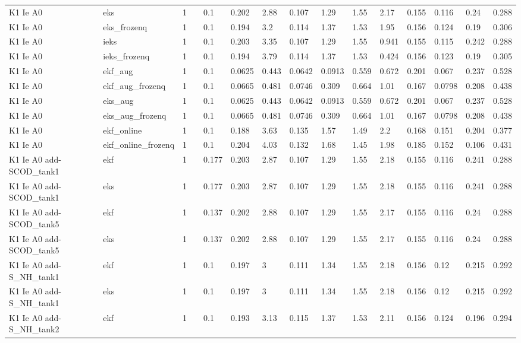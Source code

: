 \begin{table}[t]
\begin{tabular}{lllllllllllllll}
K1 Ie A0 & eks & 1 &  & 0.1 & 0.202 & 2.88 & 0.107 & 1.29 & 1.55 & 2.17 & 0.155 & 0.116 & 0.24 & 0.288 \\
K1 Ie A0 & eks\_frozenq & 1 &  & 0.1 & 0.194 & 3.2 & 0.114 & 1.37 & 1.53 & 1.95 & 0.156 & 0.124 & 0.19 & 0.306 \\
K1 Ie A0 & ieks & 1 &  & 0.1 & 0.203 & 3.35 & 0.107 & 1.29 & 1.55 & 0.941 & 0.155 & 0.115 & 0.242 & 0.288 \\
K1 Ie A0 & ieks\_frozenq & 1 &  & 0.1 & 0.194 & 3.79 & 0.114 & 1.37 & 1.53 & 0.424 & 0.156 & 0.123 & 0.19 & 0.305 \\
K1 Ie A0 & ekf\_aug & 1 &  & 0.1 & 0.0625 & 0.443 & 0.0642 & 0.0913 & 0.559 & 0.672 & 0.201 & 0.067 & 0.237 & 0.528 \\
K1 Ie A0 & ekf\_aug\_frozenq & 1 &  & 0.1 & 0.0665 & 0.481 & 0.0746 & 0.309 & 0.664 & 1.01 & 0.167 & 0.0798 & 0.208 & 0.438 \\
K1 Ie A0 & eks\_aug & 1 &  & 0.1 & 0.0625 & 0.443 & 0.0642 & 0.0913 & 0.559 & 0.672 & 0.201 & 0.067 & 0.237 & 0.528 \\
K1 Ie A0 & eks\_aug\_frozenq & 1 &  & 0.1 & 0.0665 & 0.481 & 0.0746 & 0.309 & 0.664 & 1.01 & 0.167 & 0.0798 & 0.208 & 0.438 \\
K1 Ie A0 & ekf\_online & 1 &  & 0.1 & 0.188 & 3.63 & 0.135 & 1.57 & 1.49 & 2.2 & 0.168 & 0.151 & 0.204 & 0.377 \\
K1 Ie A0 & ekf\_online\_frozenq & 1 &  & 0.1 & 0.204 & 4.03 & 0.132 & 1.68 & 1.45 & 1.98 & 0.185 & 0.152 & 0.106 & 0.431 \\
K1 Ie A0 add-SCOD\_tank1 & ekf & 1 &  & 0.177 & 0.203 & 2.87 & 0.107 & 1.29 & 1.55 & 2.18 & 0.155 & 0.116 & 0.241 & 0.288 \\
K1 Ie A0 add-SCOD\_tank1 & eks & 1 &  & 0.177 & 0.203 & 2.87 & 0.107 & 1.29 & 1.55 & 2.18 & 0.155 & 0.116 & 0.241 & 0.288 \\
K1 Ie A0 add-SCOD\_tank5 & ekf & 1 &  & 0.137 & 0.202 & 2.88 & 0.107 & 1.29 & 1.55 & 2.17 & 0.155 & 0.116 & 0.24 & 0.288 \\
K1 Ie A0 add-SCOD\_tank5 & eks & 1 &  & 0.137 & 0.202 & 2.88 & 0.107 & 1.29 & 1.55 & 2.17 & 0.155 & 0.116 & 0.24 & 0.288 \\
K1 Ie A0 add-S\_NH\_tank1 & ekf & 1 &  & 0.1 & 0.197 & 3 & 0.111 & 1.34 & 1.55 & 2.18 & 0.156 & 0.12 & 0.215 & 0.292 \\
K1 Ie A0 add-S\_NH\_tank1 & eks & 1 &  & 0.1 & 0.197 & 3 & 0.111 & 1.34 & 1.55 & 2.18 & 0.156 & 0.12 & 0.215 & 0.292 \\
K1 Ie A0 add-S\_NH\_tank2 & ekf & 1 &  & 0.1 & 0.193 & 3.13 & 0.115 & 1.37 & 1.53 & 2.11 & 0.156 & 0.124 & 0.196 & 0.294 \\

\end{tabular}
\end{table}
